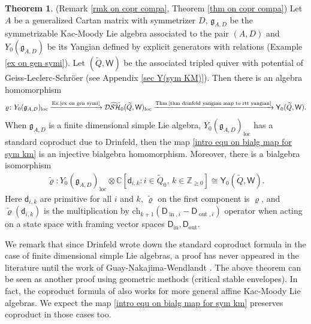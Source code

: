 \documentclass[10pt]{amsart}
\theoremstyle{definition}
\newtheorem{Theorem}{Theorem}[section]
\numberwithin{equation}{section}
\newcommand{\bC}{\mathbb{C}}
\newcommand{\bZ}{\mathbb{Z}}
\newcommand{\loc}{\mathrm{loc}}
\newcommand{\sW}{\mathsf{W}}
\newcommand{\In}{\operatorname{in}}
\newcommand{\Out}{\operatorname{out}}
\begin{document}
\begin{Theorem}(Remark \ref{rmk on copr compa}, Theorem \ref{thm on copr compa})
Let $A$ be a generalized Cartan matrix with symmetrizer $D$, $\mathfrak{g}_{A,D}$ be the symmetrizable Kac-Moody Lie algebra associated to the pair $(A,D)$ and $Y_{0}(\mathfrak{g}_{A,D})$ be its Yangian defined by explicit generators with relations 
(Example \ref{ex on gen symi}). Let $(\widetilde{Q}, \sW)$ be the associated tripled quiver with potential of Geiss-Leclerc-Schr\"oer \cite{GLS} (see Appendix \ref{sec Y(sym KM)}).
Then there is an algebra homomorphism 
\begin{equation}\label{intro equ on bialg map for sym km}\varrho\colon Y_{0}(\mathfrak{g}_{A,D})_{\loc}\xrightarrow{\text{Ex.\ref{ex on gen symi}}} \mathcal D\widetilde{\mathcal{SH}}_0(\widetilde{Q},\sW)_{\loc}\xrightarrow{\text{Thm.\ref{thm drinfeld yangian map to rtt yangian}}} \mathsf Y_0(\widetilde{Q},\sW). \end{equation}
When $\mathfrak{g}_{A,D}$ is a finite dimensional simple Lie algebra, $Y_{0}(\mathfrak{g}_{A,D})_{\loc}$ has a standard coproduct due to Drinfeld, then the map 
\eqref{intro equ on bialg map for sym km}
is an injective bialgebra homomorphism. Moreover, there is a bialgebra isomorphism
\begin{align*}
\widetilde{\varrho}\colon Y_{0}(\mathfrak{g}_{A,D})_{\loc}\otimes \bC[\mathsf d_{i,k}: i\in \widetilde{Q}_0,\, k\in \bZ_{\geqslant 0}]\cong \mathsf Y_0(\widetilde{Q},\sW).
\end{align*}
Here $\mathsf d_{i,k}$ are primitive for all $i$ and $k$, $\widetilde{\varrho}$ on the first component is $\varrho$, and $\widetilde{\varrho}(\mathsf d_{i,k})$ is the multiplication by $\mathrm{ch}_{k+1}(\mathsf D_{\In,i}-\mathsf D_{\Out,i})$ operator when acting on a state space with framing vector spaces $\mathsf D_{\In}, \mathsf D_{\Out}$.
\end{Theorem}
We remark that since Drinfeld \cite{Dri} wrote down the standard coproduct formula in the case of finite dimensional simple Lie algebras, a proof has never appeared in the literature until the work of Guay-Nakajima-Wendlandt \cite{GNW}. The above theorem can be seen as another proof using geometric methods (critical stable envelopes). 
In fact, the coproduct formula of \cite{GNW} also works for more general affine Kac-Moody Lie algebras. We expect 
the map \eqref{intro equ on bialg map for sym km} preserves coproduct in those cases too. 
\end{document}

